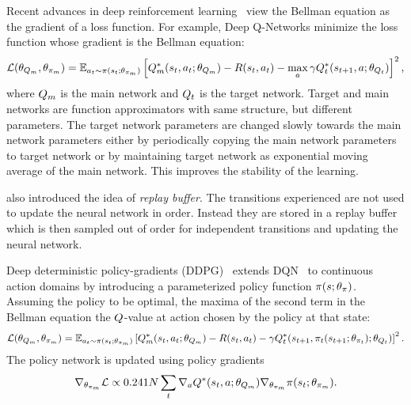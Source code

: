 Recent advances in deep reinforcement learning~\citep{MnKaSiNATURE2015} view the
Bellman equation as the gradient of a loss function. For example, Deep
Q-Networks minimize the loss function whose gradient is the Bellman equation:
%
\begin{align}
  \mathcal{L}(\theta_{Q_m}, \theta_{\pi_m}) = \mathbb{E}_{a_t\sim\pi(s_t; \theta_{\pi_m})}\left[
  Q^*_m(s_t, a_t; \theta_{Q_m}) -
  R(s_t, a_t) - \max_{a}\gamma Q^*_t(s_{t+1}, a; \theta_{Q_t}) \right]^2,
  \label{eq:bellman-dqn}
\end{align}
%
where $Q_m$ is the main network and $Q_t$ is the target network. Target and main
networks are function approximators with same structure, but different
parameters. The target network parameters are changed slowly towards the main
network parameters either by periodically copying the main network parameters to
target network or by maintaining target network as exponential moving average of
the main network. This improves the stability of the learning.

\citet{MnKaSiNATURE2015} also introduced the idea of \emph{replay buffer}.
The transitions experienced are not used to update the neural network in order.
Instead they are stored in a replay buffer which is then sampled out of order
for independent transitions and updating the neural network.

Deep deterministic policy-gradients (DDPG)~\citep{lillicrap2015continuous}
extends DQN~\citep{MnKaSiNATURE2015} to continuous action domains by introducing
a parameterized policy function $\pi(s; \theta_\pi)$. 
Assuming the policy to be optimal, the maxima of the second term in the Bellman
equation the $Q$-value at action chosen by the policy at that state:
%
\begin{align}
  \mathcal{L}(\theta_{Q_m}, \theta_{\pi_m}) = \mathbb{E}_{a_t\sim\pi(s_t; \theta_{\pi_m})}\left[
  Q^*_m(s_t, a_t; \theta_{Q_m}) -
  R(s_t, a_t) -
  \gamma Q^*_t(s_{t+1}, \pi_t(s_{t+1}; \theta_{\pi_t}); \theta_{Q_t}) \right]^2.
  \label{eq:bellman-ddpg}
\end{align}
%
The policy network is updated using policy gradients
%
\begin{align}
\nabla_{\theta_{\pi_m}} \mathcal{L} \propto 0.24{1}{N} \sum_t \nabla_a Q^*(s_t, a; \theta_{Q_m})\nabla_{\theta_{\pi_m}} \pi(s_t; \theta_{\pi_m}).
\end{align}%
% 


